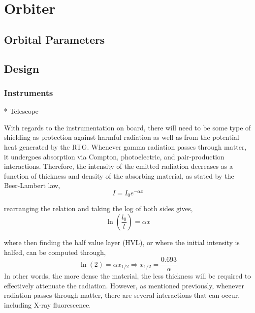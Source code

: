 \chapter{Orbiter}

\section{Orbital Parameters}

\section{Design}

\subsection{Instruments}

* Telescope

With regards to the instrumentation on board, there will need to be some type of shielding as protection against harmful radiation as well as from the potential heat generated by the RTG. Whenever gamma radiation passes through matter, it undergoes absorption via Compton, photoelectric, and pair-production interactions. Therefore, the intensity of the emitted radiation decreases as a function of thickness and density of the absorbing material, as stated by the Beer-Lambert law,
\begin{equation}
I = I_0 e^{-\alpha x}
\end{equation}

rearranging the relation and taking the log of both sides gives,\\
\begin{equation}
\ln\left( \frac{l_0}{l}\right) = \alpha x
\end{equation}

where then finding the half value layer (HVL), or where the initial intensity is halfed, can be computed through,\\
\begin{equation}
\ln(2) = \alpha x_{1/2} \Rightarrow x_{1/2} = \frac{0.693}{\alpha} \label{halfthickness}
\end{equation}
In other words, the more dense the material, the less thickness will be required to effectively attenuate the radiation. However, as mentioned previously, whenever radiation passes through matter, there are several interactions that can occur, including X-ray fluorescence.


